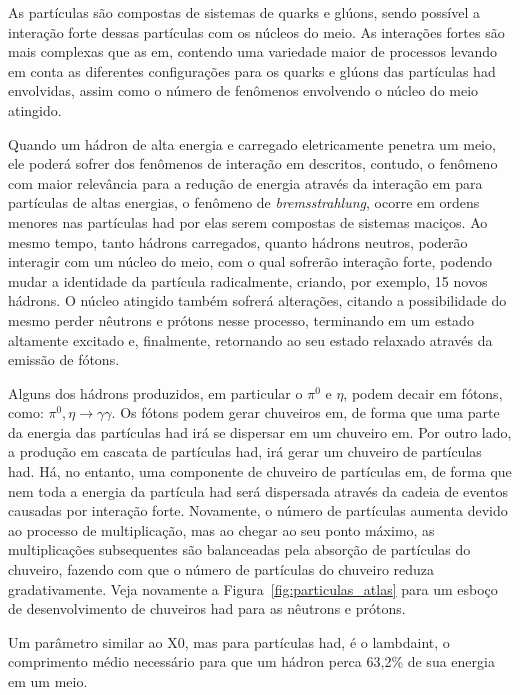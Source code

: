 As partículas  são compostas de sistemas de quarks 
e glúons, sendo possível a interação forte dessas partículas com os núcleos do meio. 
As interações fortes são mais complexas que as \gls{em}, contendo uma variedade maior de
processos levando em conta as diferentes configurações para os quarks e glúons
das partículas \gls{had} envolvidas, assim como o número de fenômenos envolvendo o 
núcleo do meio atingido.

Quando um hádron de alta energia e carregado eletricamente penetra um meio, 
ele poderá sofrer dos fenômenos de interação \gls{em} descritos, contudo,
o fenômeno com maior relevância para a redução de energia através da interação
\gls{em} para partículas de altas energias, o
fenômeno de \emph{bremsstrahlung}, ocorre em ordens menores nas partículas
\gls{had} por elas serem compostas de sistemas maciços. Ao mesmo tempo, 
tanto hádrons carregados, quanto hádrons neutros, poderão interagir com um
núcleo do meio, com o qual sofrerão interação forte, podendo mudar a identidade 
da partícula radicalmente, criando, por exemplo, 15 novos hádrons. O núcleo atingido também sofrerá
alterações, citando a possibilidade do mesmo perder nêutrons e prótons nesse
processo, terminando em um estado altamente excitado e, finalmente, retornando
ao seu estado relaxado através da emissão de fótons.

Alguns dos hádrons produzidos, em particular o $\pi^0$ e $\eta$, 
podem decair em fótons, como: $\pi^0,\eta\rightarrow\gamma\gamma$. 
Os fótons podem gerar chuveiros \gls{em}, de forma que uma parte da energia das partículas
\gls{had} irá se dispersar em um chuveiro \gls{em}. Por outro lado, a 
produção em cascata de partículas \gls{had}, irá gerar um chuveiro de partículas 
\gls{had}. Há, no entanto, uma componente de chuveiro de partículas \gls{em}, 
de forma que nem toda a energia da partícula \gls{had} 
será dispersada através da cadeia de eventos causadas por interação forte. 
Novamente, o número de partículas aumenta 
devido ao processo de multiplicação, mas
ao chegar ao seu ponto máximo, as multiplicações subsequentes são
balanceadas pela absorção de partículas do chuveiro, fazendo com que o número de
partículas do chuveiro reduza gradativamente. Veja novamente a
Figura~\ref{fig:particulas_atlas} para um esboço de desenvolvimento de chuveiros
\gls{had} para as nêutrons e prótons.

Um parâmetro similar ao \gls{X0}, mas para partículas \gls{had}, é o \gls{lambdaint},
o comprimento médio necessário para que um hádron perca 63,2\% de sua
energia em um meio. 

